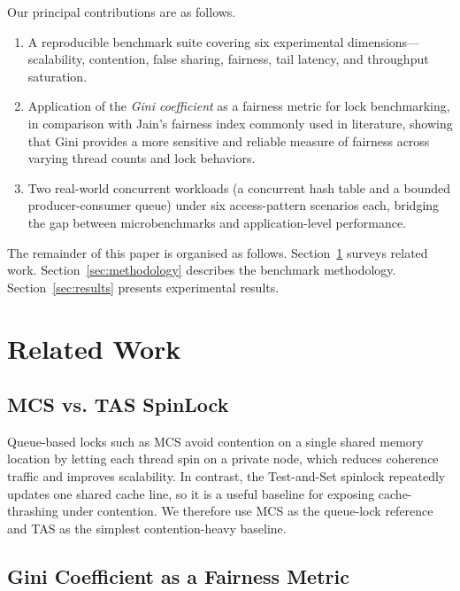 \documentclass[conference]{IEEEtran}
\begin{document}
Our principal contributions are as follows.

\begin{enumerate}
    \item A reproducible benchmark suite covering six experimental dimensions---scalability, contention, false sharing, fairness, tail latency, and throughput saturation.

    \item Application of the \emph{Gini coefficient} as a fairness metric for lock benchmarking, in comparison with Jain’s fairness index commonly used in literature, showing that Gini provides a more sensitive and reliable measure of fairness across varying thread counts and lock behaviors.

    \item Two real-world concurrent workloads (a concurrent hash table and a bounded producer-consumer queue) under six access-pattern scenarios each, bridging the gap between microbenchmarks and application-level performance.
\end{enumerate}

The remainder of this paper is organised as follows.
Section~\ref{sec:related} surveys related work.
Section~\ref{sec:methodology} describes the benchmark methodology.
Section~\ref{sec:results} presents experimental results.

\section{Related Work}
\label{sec:related}

\subsection{MCS vs. TAS SpinLock}

Queue-based locks such as MCS \cite{mellor1991algorithms} avoid contention on a single shared memory location by letting each thread spin on a private node, which reduces coherence traffic and improves scalability. In contrast, the Test-and-Set spinlock repeatedly updates one shared cache line, so it is a useful baseline for exposing cache-thrashing under contention. We therefore use MCS as the queue-lock reference and TAS as the simplest contention-heavy baseline.

\subsection{Gini Coefficient as a Fairness Metric}
\end{document}
